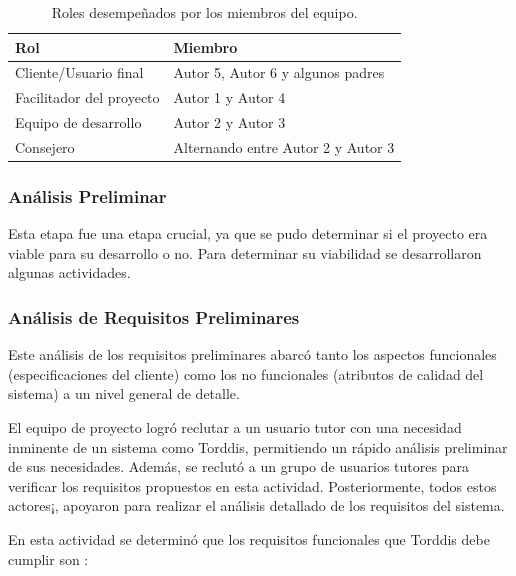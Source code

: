 \documentclass[a4paper,fleqn]{cas-sc}
\begin{document}
			\begin{table}[H]
				\caption{Roles desempeñados por los miembros del equipo.\label{tab:Roles}}
				\begin{tabularx}{0.8\textwidth}{>{\arraybackslash}X >{\arraybackslash}X}
					\toprule
					\textbf{Rol}	& \textbf{Miembro}\\
					\midrule
					Cliente/Usuario final & Autor 5, Autor 6 y algunos padres\\
					Facilitador del proyecto		&  Autor 1 y Autor 4\\
					Equipo de desarrollo		&  Autor 2 y Autor 3\\
					Consejero		&  Alternando entre Autor 2 y Autor 3\\
					\bottomrule
				\end{tabularx}
			\end{table}
			
			\subsubsection{Análisis Preliminar}
				Esta etapa fue una etapa crucial, ya que se pudo determinar si el proyecto era viable para su desarrollo o no. Para determinar su viabilidad se desarrollaron algunas actividades.
				
				\subsubsection*{Análisis de Requisitos Preliminares}
					Este análisis de los requisitos preliminares abarcó tanto los aspectos funcionales (especificaciones del cliente) como los no funcionales (atributos de calidad del sistema) a un nivel general de detalle.
					
					El equipo de proyecto logró reclutar a un usuario tutor con una necesidad inminente de un sistema como Torddis, permitiendo un rápido análisis preliminar de sus necesidades. Además, se reclutó a un grupo de usuarios tutores para verificar los requisitos propuestos en esta actividad. Posteriormente, todos estos actores¡, apoyaron para realizar el análisis detallado de los requisitos del sistema.
					
					En esta actividad se determinó que los requisitos funcionales que Torddis debe cumplir son \citep{Asish2022Detecting,Pabba2022AnIntelligent,Vettivel2018System}:%
					 
\end{document}
